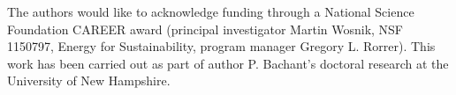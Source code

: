 \documentclass[times]{weauth}
\begin{document}
\acks The authors would like to acknowledge funding through a National Science
Foundation CAREER award (principal investigator Martin Wosnik, NSF 1150797,
Energy for Sustainability, program manager Gregory L. Rorrer). This work has
been carried out as part of author P. Bachant's doctoral research at the
University of New Hampshire.



\end{document}
